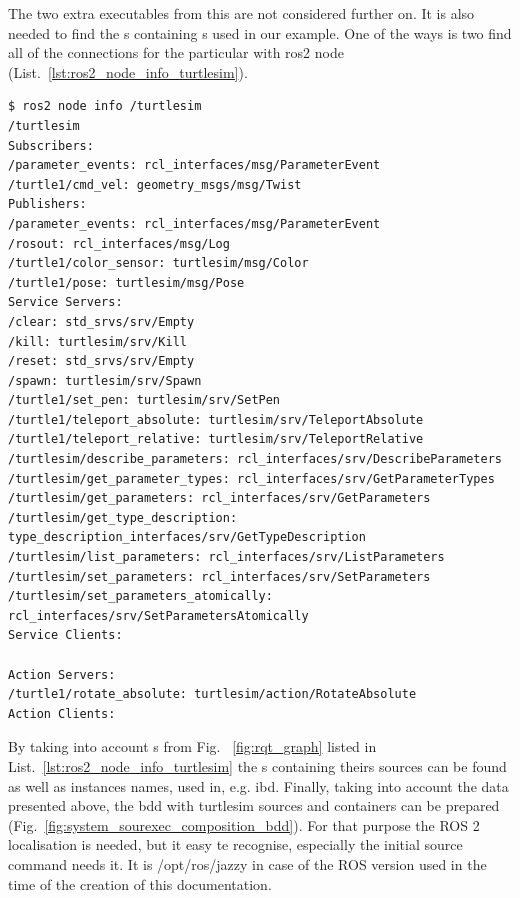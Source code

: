 \documentclass[11pt,oneside,a4paper]{report}
\begin{document}
The two extra executables from this \stPackage{} are not considered further on. It is also needed to find the \stPackage{}s containing \stRosConnection{}s used in our example. One of the ways is two find all of the connections for the particular \stNode{} with \textsf{ros2 node} \stCLTool{} (List.~\ref{lst:ros2_node_info_turtlesim}).


\begin{lstlisting}[style=terminal,label={lst:ros2_node_info_turtlesim},caption={ros2 node info /turtlesim}]
$ ros2 node info /turtlesim 
/turtlesim
Subscribers:
/parameter_events: rcl_interfaces/msg/ParameterEvent
/turtle1/cmd_vel: geometry_msgs/msg/Twist
Publishers:
/parameter_events: rcl_interfaces/msg/ParameterEvent
/rosout: rcl_interfaces/msg/Log
/turtle1/color_sensor: turtlesim/msg/Color
/turtle1/pose: turtlesim/msg/Pose
Service Servers:
/clear: std_srvs/srv/Empty
/kill: turtlesim/srv/Kill
/reset: std_srvs/srv/Empty
/spawn: turtlesim/srv/Spawn
/turtle1/set_pen: turtlesim/srv/SetPen
/turtle1/teleport_absolute: turtlesim/srv/TeleportAbsolute
/turtle1/teleport_relative: turtlesim/srv/TeleportRelative
/turtlesim/describe_parameters: rcl_interfaces/srv/DescribeParameters
/turtlesim/get_parameter_types: rcl_interfaces/srv/GetParameterTypes
/turtlesim/get_parameters: rcl_interfaces/srv/GetParameters
/turtlesim/get_type_description: type_description_interfaces/srv/GetTypeDescription
/turtlesim/list_parameters: rcl_interfaces/srv/ListParameters
/turtlesim/set_parameters: rcl_interfaces/srv/SetParameters
/turtlesim/set_parameters_atomically: rcl_interfaces/srv/SetParametersAtomically
Service Clients:

Action Servers:
/turtle1/rotate_absolute: turtlesim/action/RotateAbsolute
Action Clients:
\end{lstlisting}

By taking into account \stRosConnection{}s from Fig.~ \ref{fig:rqt_graph} listed in List.~\ref{lst:ros2_node_info_turtlesim} the \stPackage{}s containing theirs sources can be found as well as 
instances names, used in, e.g. ibd. Finally, taking into account the data presented above, the bdd with \textsf{turtlesim} \stSystem{} sources and containers can be prepared (Fig.~\ref{fig:system_sourexec_composition_bdd}). For that purpose the ROS 2 \stWorkspace{} localisation is needed, but it easy te recognise, especially the initial \textsf{source} command needs it. It is  \textsf{/opt/ros/jazzy} in case of the ROS version used in the time of the creation of this documentation.
\end{document}
